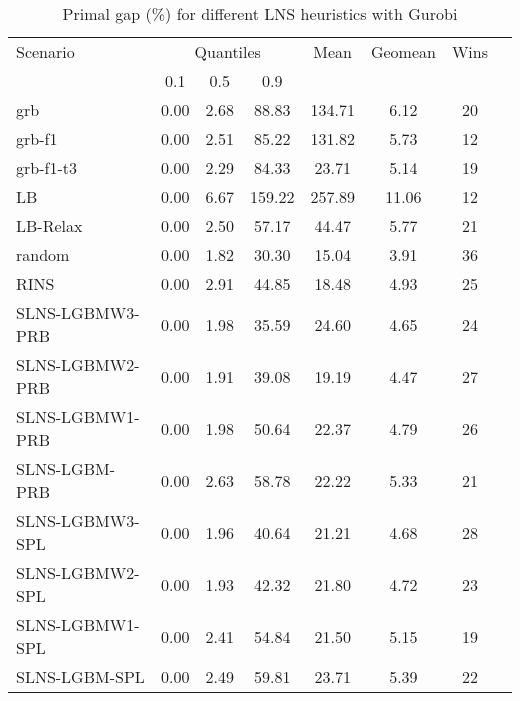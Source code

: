 \documentclass[3p, authoryear, times]{elsarticle}
\begin{document}
\begin{table}[h]
\centering
\caption{Primal gap (\%) for different LNS heuristics with Gurobi}
\label{tab:lns:primal_gap_grb}
\begin{tabular}{lccccccc}
\toprule
{Scenario} & \multicolumn{3}{c}{Quantiles} & {Mean} & {Geomean} & {Wins} \\
{} & {0.1} & {0.5} & {0.9} & {} & {} & {} \\
\midrule
grb & 0.00 & 2.68 & 88.83 & 134.71 & 6.12 & 20 \\
grb-f1 & 0.00 & 2.51 & 85.22 & 131.82 & 5.73 & 12 \\
grb-f1-t3 & 0.00 & 2.29 & 84.33 & 23.71 & 5.14 & 19 \\
LB & 0.00 & 6.67 & 159.22 & 257.89 & 11.06 & 12 \\
LB-Relax & 0.00 & 2.50 & 57.17 & 44.47 & 5.77 & 21 \\
random & 0.00 & 1.82 & 30.30 & 15.04 & 3.91 & 36 \\
RINS & 0.00 & 2.91 & 44.85 & 18.48 & 4.93 & 25 \\
SLNS-LGBMW3-PRB & 0.00 & 1.98 & 35.59 & 24.60 & 4.65 & 24 \\
SLNS-LGBMW2-PRB & 0.00 & 1.91 & 39.08 & 19.19 & 4.47 & 27 \\
SLNS-LGBMW1-PRB & 0.00 & 1.98 & 50.64 & 22.37 & 4.79 & 26 \\
SLNS-LGBM-PRB & 0.00 & 2.63 & 58.78 & 22.22 & 5.33 & 21 \\
SLNS-LGBMW3-SPL & 0.00 & 1.96 & 40.64 & 21.21 & 4.68 & 28 \\
SLNS-LGBMW2-SPL & 0.00 & 1.93 & 42.32 & 21.80 & 4.72 & 23 \\
SLNS-LGBMW1-SPL & 0.00 & 2.41 & 54.84 & 21.50 & 5.15 & 19 \\
SLNS-LGBM-SPL & 0.00 & 2.49 & 59.81 & 23.71 & 5.39 & 22 \\
\bottomrule
\end{tabular}
\end{table}
\end{document}
